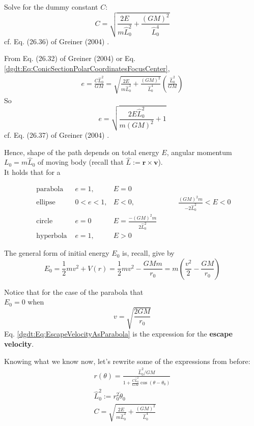 Solve for the dummy constant $C$:
\begin{equation}
C = \sqrt{ \frac{2E}{m \widehat{L}_0^2 } + \frac{ (GM)^2 }{ \widehat{L}_0^4 } }
\end{equation}
cf. Eq. (26.36) of Greiner (2004) \cite{dgdt:Grei2004}.

From Eq. (26.32) of Greiner (2004) \cite{dgdt:Grei2004} or Eq. \ref{dgdt:Eq:ConicSectionPolarCoordinatesFocusCenter}, 
\[
\begin{gathered}
e = \frac{C \widehat{L}_0^2 }{ GM} = \sqrt{ \frac{2 E }{ m \widehat{L}_0^2} + \frac{ (GM)^2 }{\widehat{L}_0^4 } } \left( \frac{\widehat{L}_0^2 }{ GM} \right)  
\end{gathered}
\]
So
\begin{equation}
\boxed{ e =  \sqrt{ \frac{ 2 E \widehat{L}_0^2 }{ m (GM)^2 } + 1 } }
\end{equation}
cf. Eq. (26.37) of Greiner (2004) \cite{dgdt:Grei2004}. 

Hence, shape of the path depends on total energy $E$, angular momentum $L_0 = m \widehat{L}_0$ of moving body (recall that $\widehat{L} := \mathbf{r} \times \mathbf{v}$). \\

It holds that for a

\[
\begin{aligned} 
\text{ parabola } & e = 1, & E = 0 & \\  
\text{ ellipse } & 0 < e < 1, & E < 0, & \qquad \, \frac{ (GM)^2 m }{ -2 \widehat{L}_0^2 } < E < 0 \\  
\text{ circle } &  e = 0 & E = \frac{ -(GM)^2 m }{ 2\widehat{L}_0^2 } & \\
\text{ hyperbola } & e = 1, & E > 0 & \, 
\end{aligned} 
\]

The general form of initial energy $E_0$ is, recall, give by
\[
E_0 = \frac{1}{2} m v^2 + V(r) = \frac{1}{2} mv^2 - \frac{GMm}{r_0} = m \left( \frac{v^2}{2} - \frac{GM}{r_0} \right) 
\]

Notice that for the case of the parabola that \\
$E_0 =0 $ when 
\begin{equation}\label{dgdt:Eq:EscapeVelocityAsParabola}
v = \sqrt{ \frac{2GM}{r_0} } 
\end{equation}
Eq. \ref{dgdt:Eq:EscapeVelocityAsParabola} is the expression for the \textbf{escape velocity}.

Knowing what we know now, let's rewrite some of the expressions from before:
\[
\begin{gathered} 
r(\theta) = \frac{ \widehat{L}_0^2 / GM}{ 1 + \frac{C \widehat{L}_0^2 }{GM} \cos{(\theta - \theta_0)} } \\ 
\widehat{L}_0^2 := r_0^2 \dot{\theta}_0 \\ 
C = \sqrt{\frac{ 2 E}{ m \widehat{L}_0^2 } + \frac{ (GM)^2 }{ \widehat{L}_0^4 } }
\end{gathered} 
\]

